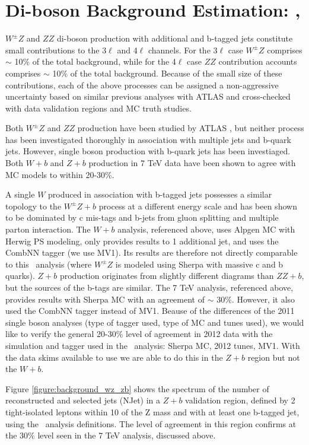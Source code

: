 \section{Di-boson Background Estimation: \WZ,\ZZ }

\label{section:wz}
$W^{\pm}Z$ and $ZZ$ di-boson production with additional and b-tagged jets constitute small contributions to 
the 3$\ell$ and 4$\ell$ channels. For the 3$\ell$ case $W^{\pm}Z$ comprises $\sim$ 10\% of the total background, while for
the 4$\ell$ case $ZZ$ contribution accounts comprises $\sim$ 10\% of the total background. 
Because of the small size of these contributions, each of the above processes can be assigned a 
non-aggressive uncertainty based on similar previous analyses with ATLAS and cross-checked with data validation 
regions and MC truth studies. 

Both $W^{\pm}Z$ and $ZZ$ production have been studied by ATLAS \cite{WZAtlas}\cite{ZZAtlas}, but neither process
has been investigated thoroughly in association with multiple jets and b-quark jets. However, single boson production with
b-quark jets has been investiaged. Both $W+b$ \cite{WbAtlas} 
and $Z+b$ \cite{ZbAtlas} production in 7 TeV data have been shown to agree with MC models to within 20-30\%. 

A single $W$ produced in association with b-tagged jets possesses a similar topology to the $W^{\pm}Z+b$ 
process at a different energy scale and has been shown to be dominated by c mis-tags and b-jets from gluon splitting 
and multiple parton interaction. The $W+b$ analysis, referenced above, uses Alpgen MC with Herwig PS modeling, only provides
results to 1 additional jet, and uses the CombNN tagger (we use MV1). Its results are therefore not directly comparable to this \tth\ analysis (where $W^{\pm}Z$ is modeled using Sherpa with massive c and b quarks). $Z+b$ production originates from slightly different diagrams than $ZZ+b$, but the sources of the b-tags are similar. The 7 TeV analysis, referenced above, provides results with Sherpa MC with an agreement of $\sim$ 30\%. However, it also used the CombNN tagger instead of MV1. Beause of the differences of the 2011 single boson analyses (type of tagger used, type of MC and tunes used), we would like to verify the general 20-30\% level of agreement in 2012 data with the simulation and tagger used in the \tth\ analysis: Sherpa MC, 2012 tunes, MV1. With the data skims available to use we are able to do this in the $Z+b$ region but not the $W+b$.  


Figure \ref{figure:background_wz_zb} shows the spectrum of the number of reconstructed and selected jets (NJet) in a 
$Z+b$ validation region, defined by 2 tight-isolated leptons within 10 \gev of the Z mass and with at 
least one b-tagged jet, using the \tth\ analysis definitions. The level of agreement in this region confirms 
at the  30\% level seen in the 7 TeV analysis, discussed above. 

